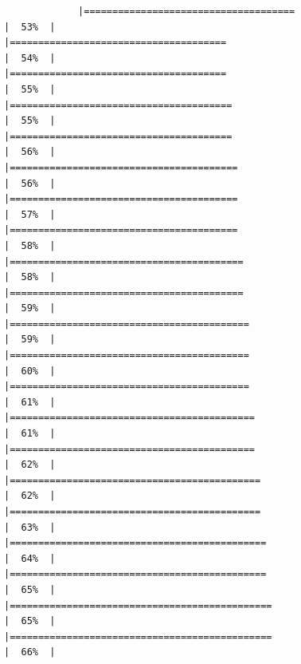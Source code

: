 \documentclass[
]{article}
\begin{document}
\begin{verbatim}
             |=====================================                                 |  53%  |                                                                              |======================================                                |  54%  |                                                                              |======================================                                |  55%  |                                                                              |=======================================                               |  55%  |                                                                              |=======================================                               |  56%  |                                                                              |========================================                              |  56%  |                                                                              |========================================                              |  57%  |                                                                              |========================================                              |  58%  |                                                                              |=========================================                             |  58%  |                                                                              |=========================================                             |  59%  |                                                                              |==========================================                            |  59%  |                                                                              |==========================================                            |  60%  |                                                                              |==========================================                            |  61%  |                                                                              |===========================================                           |  61%  |                                                                              |===========================================                           |  62%  |                                                                              |============================================                          |  62%  |                                                                              |============================================                          |  63%  |                                                                              |=============================================                         |  64%  |                                                                              |=============================================                         |  65%  |                                                                              |==============================================                        |  65%  |                                                                              |==============================================                        |  66%  |                                                                  
\end{verbatim}
\end{document}
